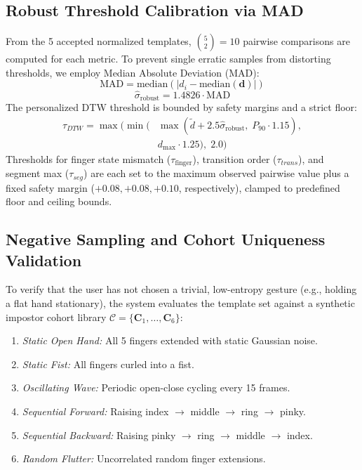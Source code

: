 \documentclass[conference]{IEEEtran}
\begin{document}
\subsection{Robust Threshold Calibration via MAD}
From the 5 accepted normalized templates, $\binom{5}{2} = 10$ pairwise comparisons are computed for each metric. To prevent single erratic samples from distorting thresholds, we employ Median Absolute Deviation (MAD):
\begin{equation}
\text{MAD} = \text{median}\left( |d_i - \text{median}(\mathbf{d})| \right)
\end{equation}
\begin{equation}
\hat{\sigma}_{\text{robust}} = 1.4826 \cdot \text{MAD}
\end{equation}
The personalized DTW threshold is bounded by safety margins and a strict floor:
\begin{equation}
\begin{split}
\tau_{DTW} = \max\!\Big( \min\!\big( &\max(\tilde{d} + 2.5\hat{\sigma}_{\text{robust}},\; P_{90} \cdot 1.15), \\
&d_{\max} \cdot 1.25 \big),\; 2.0 \Big)
\end{split}
\end{equation}
Thresholds for finger state mismatch ($\tau_{\text{finger}}$), transition order ($\tau_{trans}$), and segment max ($\tau_{seg}$) are each set to the maximum observed pairwise value plus a fixed safety margin ($+0.08, +0.08, +0.10$, respectively), clamped to predefined floor and ceiling bounds.

\subsection{Negative Sampling and Cohort Uniqueness Validation}
To verify that the user has not chosen a trivial, low-entropy gesture (e.g., holding a flat hand stationary), the system evaluates the template set against a synthetic impostor cohort library $\mathcal{C} = \{\mathbf{C}_1, \ldots, \mathbf{C}_6\}$:
\begin{enumerate}
\item \textit{Static Open Hand:} All 5 fingers extended with static Gaussian noise.
\item \textit{Static Fist:} All fingers curled into a fist.
\item \textit{Oscillating Wave:} Periodic open-close cycling every 15 frames.
\item \textit{Sequential Forward:} Raising index $\rightarrow$ middle $\rightarrow$ ring $\rightarrow$ pinky.
\item \textit{Sequential Backward:} Raising pinky $\rightarrow$ ring $\rightarrow$ middle $\rightarrow$ index.
\item \textit{Random Flutter:} Uncorrelated random finger extensions.
\end{enumerate}
\end{document}
